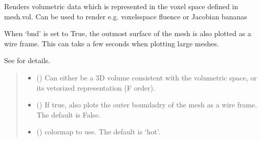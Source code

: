 \documentclass[letterpaper,10pt,english]{sphinxmanual}
\begin{document}
\begin{fulllineitems}
\begin{fulllineitems}
\label{\detokenize{_autosummary/nirfasterff.base.mesh.mesh:nirfasterff.base.mesh.mesh.plotvol}}
\pysigstartsignatures
\pysiglinewithargsret
{}
{\sphinxparamcomma {}\sphinxparamcomma {}\sphinxparamcomma {}\sphinxparamcomma {}\sphinxparamcomma {}}
{}
\pysigstopsignatures
\sphinxAtStartPar
Renders volumetric data which is represented in the voxel space defined in mesh.vol.
Can be used to render e.g. voxels\sphinxhyphen{}space fluence or Jacobian bananas

\sphinxAtStartPar
When ‘bnd’ is set to True, the outmost surface of the mesh is also plotted as a wire frame.
This can take a few seconds when plotting large meshes.

\sphinxAtStartPar
See {\hyperref[\detokenize{_autosummary/nirfasterff.visualize.plotvol:nirfasterff.visualize.plotvol}]{}} for details.
\begin{quote}\begin{description}
\begin{itemize}
\item {} 
\sphinxAtStartPar
{} () \textendash{} Can either be a 3D volume consistent with the volumetric space, or its vetorized representation (F order).

\item {} 
\sphinxAtStartPar
{} (\sphinxstyleliteralemphasis{\sphinxupquote{, }}) \textendash{} If true, also plots the outer boundadry of the mesh as a wire frame. The default is False.

\item {} 
\sphinxAtStartPar
{} (\sphinxstyleliteralemphasis{\sphinxupquote{, }}) \textendash{} colormap to use. The default is ‘hot’.


\end{itemize}
\end{description}
\end{quote}
\end{fulllineitems}
\end{fulllineitems}
\end{document}
